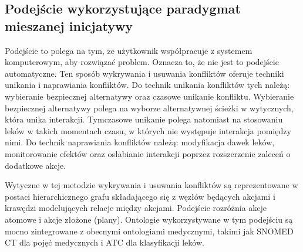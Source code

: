 \subsection{Podejście wykorzystujące paradygmat mieszanej inicjatywy}
Podejście to polega na tym, że użytkownik współpracuje z systemem komputerowym, aby rozwiązać problem.\cite{Piovesan} Oznacza to, że nie jest to podejście automatyczne. Ten sposób wykrywania i usuwania konfliktów oferuje techniki unikania i naprawiania konfliktów. Do technik unikania konfliktów tych należą: wybieranie bezpiecznej alternatywy oraz czasowe unikanie konfliktu. Wybieranie bezpiecznej alternatywy polega na wyborze alternatywnej ścieżki w wytycznych, która unika interakcji. Tymczasowe unikanie polega natomiast na stosowaniu leków w takich momentach czasu, w których nie występuje interakcja pomiędzy nimi. Do technik naprawiania konfliktów należą: modyfikacja dawek leków, monitorowanie efektów oraz osłabianie interakcji poprzez rozszerzenie zaleceń o dodatkowe akcje. 

Wytyczne w tej metodzie wykrywania i usuwania konfliktów są reprezentowane w postaci hierarchicznego grafu składającego się z węzłów będących akcjami i krawędzi modelujących relacje między akcjami. Podejście rozróżnia akcje atomowe i akcje złożone (plany). Ontologie wykorzystywane w tym podejściu są mocno zintegrowane z obecnymi ontologiami medycznymi, takimi jak SNOMED CT dla pojęć medycznych i ATC dla klasyfikacji leków.



